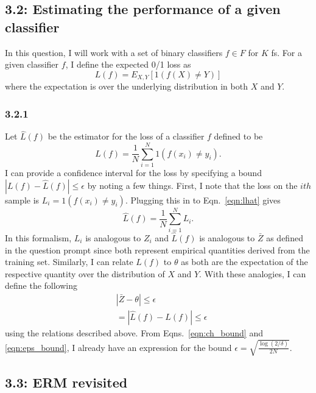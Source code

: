 \documentclass[12pt]{amsart}
\begin{document}
\subsection*{3.2: Estimating the performance of a given classifier}

In this question, I will work with a set of binary classifiers $f \in F$ for $K$ fs.  For a given classifier $f$, I define the expected 0/1 loss as
\begin{equation} \label{eqn:loss_01}
L(f) = E_{X,Y}[1(f(X) \neq Y)]
\end{equation}
where the expectation is over the underlying distribution in both $X$ and $Y$.

\subsubsection*{3.2.1}

Let $\hat{L}(f)$ be the estimator for the loss of a classifier $f$ defined to be
\begin{equation} \label{eqn:lhat}
\hat{L}(f) = \frac{1}{N} \sum_{i = 1}^N 1(f(x_i) \neq y_i).
\end{equation}
I can provide a confidence interval for the loss by specifying a bound $|L(f) - \hat{L}(f)| \leq \epsilon$ by noting a few things.  First, I note that the loss on the $ith$ sample is $L_i = 1(f(x_i) \neq y_i)$.  Plugging this in to Eqn.~\ref{eqn:lhat} gives
\begin{equation}
\hat{L}(f) = \frac{1}{N} \sum_{i = 1}^N L_i.
\end{equation}
In this formalism, $L_i$ is analogous to $Z_i$ and $\hat{L}(f)$ is analogous to $\bar{Z}$ as defined in the question prompt since both represent empirical quantities derived from the training set.  Similarly, I can relate $L(f)$ to $\theta$ as both are the expectation of the respective quantity over the distribution of $X$ and $Y$.  With these analogies, I can define the following
\begin{equation}
\begin{split}
& |\bar{Z} - \theta | \leq \epsilon \\
& = |\hat{L}(f) - L(f) | \leq \epsilon
\end{split}
\end{equation}
using the relations described above.  From Eqns.~\ref{eqn:ch_bound} and \ref{eqn:eps_bound}, I already have an expression for the bound $\epsilon = \sqrt{\frac{\log(2/\delta)}{2N}}$. 

\subsection*{3.3: ERM revisited}
\end{document}
